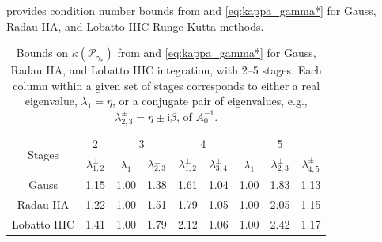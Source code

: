 \documentclass[a4paper,10pt]{article}
\begin{document}
 provides condition number bounds from  and
\eqref{eq:kappa_gamma*} for Gauss, Radau IIA, and Lobatto IIIC Runge-Kutta methods.
{
\renewcommand{\arraystretch}{1.15}
\begin{table}[!ht]
  \centering
  \begin{tabular}{| c | c | cc | cc | ccc |}  %
  \hline
\multirow{2}{*}{Stages} & 2 & \multicolumn{2}{c}{3} & \multicolumn{2}{|c}{4} & \multicolumn{3}{|c|}{5} \\

& {$\lambda_{1,2}^\pm$} & {$\lambda_1$} & {$\lambda_{2,3}^\pm$} & {$\lambda_{1,2}^\pm$} &
	{$\lambda_{3,4}^\pm$} & {$\lambda_1$} & {$\lambda_{2,3}^\pm$} & {$\lambda_{4,5}^\pm$} \\
\hline
Gauss & 1.15 & 1.00 & 1.38 & 1.61 & 1.04 & 1.00 & 1.83 & 1.13 \\
Radau IIA & 1.22 & 1.00 & 1.51 & 1.79 & 1.05 & 1.00 & 2.05 & 1.15 \\
Lobatto IIIC & 1.41 & 1.00 & 1.79 & 2.12 & 1.06 & 1.00 & 2.42 & 1.17 \\\hline
  \end{tabular}
  \caption{Bounds on $\kappa(\mathcal{P}_{\gamma_*})$ from  and
  \eqref{eq:kappa_gamma*} for Gauss, Radau IIA, and Lobatto IIIC integration,
  with 2--5 stages. Each column within a given set of stages corresponds
  to either a real eigenvalue, $\lambda_1 = \eta$, or a conjugate pair of eigenvalues,
  e.g., $\lambda_{2,3}^\pm = \eta \pm \mathrm{i}\beta$, of
  $A_0^{-1}$.}\label{tab:cond}
\end{table}
\vspace{-3ex}
}
\end{document}
